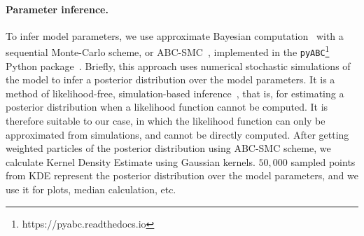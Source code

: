 \documentclass[12pt]{extarticle}
\begin{document}
\paragraph{Parameter inference.} To infer model parameters, we use approximate Bayesian computation~\citep{Sunnaker2013} with a sequential Monte-Carlo scheme, or ABC-SMC~\citep{Sisson2009}, implemented in the \texttt{pyABC}\footnote{https://pyabc.readthedocs.io} Python 
package~\citep{Klinger2018}.
Briefly, this approach uses numerical stochastic simulations of the model to infer a posterior distribution over the model parameters. It is a method of likelihood-free, simulation-based inference~\citep{Cranmer2020}, that is, for estimating a posterior distribution when a likelihood function cannot be computed. It is therefore suitable to our case, in which the likelihood function can only be approximated from simulations, and cannot be directly computed. 
After getting weighted particles of the posterior distribution using ABC-SMC scheme, we calculate Kernel Density Estimate using Gaussian kernels. $50,000$ sampled points from KDE represent the posterior distribution over the model parameters, and we use it for plots, median calculation, etc.
\end{document}
